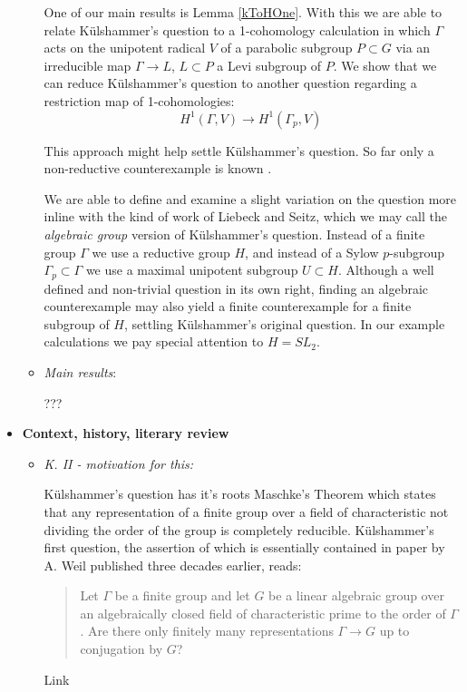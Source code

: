 \begin{itemize}
\begin{itemize}
		
		One of our main results is Lemma \ref{kToHOne}. With this we are able to relate K\"ulshammer's question to a 1-cohomology calculation in which $\Gamma$ acts on the unipotent radical $V$ of a parabolic subgroup $P \subset G$ via an irreducible map $\Gamma \rightarrow L$, $L \subset P$ a Levi subgroup of $P$. We show that we can reduce K\"ulshammer's question to another question regarding a restriction map of 1-cohomologies:
		\begin{displaymath}
			H^1(\Gamma, V) \rightarrow H^1(\Gamma_p, V)
		\end{displaymath}
		
		
		This approach might help settle K\"ulshammer's question. So far only a non-reductive counterexample is known \cite{weil1964remarks}. 
		
		
		We are able to define and examine a slight variation on the question more inline with the kind of work of Liebeck and Seitz, which we may call the \emph{algebraic group} version of K\"ulshammer's question. Instead of a finite group $\Gamma$ we use a reductive group $H$, and instead of a Sylow $p$-subgroup $\Gamma_p \subset \Gamma$ we use a maximal unipotent subgroup $U \subset H$. Although a well defined and non-trivial question in its own right, finding an algebraic counterexample may also yield a finite counterexample for a finite subgroup of $H$, settling K\"ulshammer's original question. In our example calculations we pay special attention to $H = SL_2$.

		\item \emph{Main results}:
		

		???
	\end{itemize}

	\item[] \textbf{Context, history, literary review}
	\begin{itemize}
		\item \emph{K. II - motivation for this:}
		
		K\"ulshammer's question has it's roots Maschke's Theorem which states that any representation of a finite group over a field of characteristic not dividing the order of the group is completely reducible. 
		K\"ulshammer's first question, the assertion of which is essentially contained in paper by A. Weil published three decades earlier, reads:
		\begin{quote}
			Let $\Gamma$ be a finite group and let $G$ be a linear algebraic group over an algebraically closed field of characteristic prime to the order of $\Gamma$. Are there only finitely many representations $\Gamma\rightarrow G$ up to conjugation by $G$?
		\end{quote}
		Link
		

\end{itemize}
\end{itemize}
